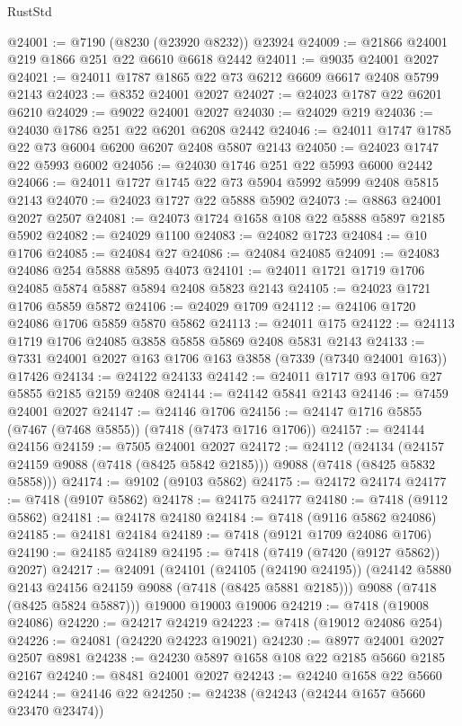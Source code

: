 \begin{lexlean}{RustStd}
\begin{coremodule}
@24001 := @7190 (@8230 (@23920 @8232)) @23924
@24009 := @21866 @24001 @219 @1866 @251 @22 @6610 @6618 @2442
@24011 := @9035 @24001 @2027
@24021 := @24011 @1787 @1865 @22 @73 @6212 @6609 @6617 @2408 @5799 @2143
@24023 := @8352 @24001 @2027
@24027 := @24023 @1787 @22 @6201 @6210
@24029 := @9022 @24001 @2027
@24030 := @24029 @219
@24036 := @24030 @1786 @251 @22 @6201 @6208 @2442
@24046 := @24011 @1747 @1785 @22 @73 @6004 @6200 @6207 @2408 @5807 @2143
@24050 := @24023 @1747 @22 @5993 @6002
@24056 := @24030 @1746 @251 @22 @5993 @6000 @2442
@24066 := @24011 @1727 @1745 @22 @73 @5904 @5992 @5999 @2408 @5815 @2143
@24070 := @24023 @1727 @22 @5888 @5902
@24073 := @8863 @24001 @2027 @2507
@24081 := @24073 @1724 @1658 @108 @22 @5888 @5897 @2185 @5902
@24082 := @24029 @1100
@24083 := @24082 @1723
@24084 := @10 @1706
@24085 := @24084 @27
@24086 := @24084 @24085
@24091 := @24083 @24086 @254 @5888 @5895 @4073
@24101 := @24011 @1721 @1719 @1706 @24085 @5874 @5887 @5894 @2408 @5823 @2143
@24105 := @24023 @1721 @1706 @5859 @5872
@24106 := @24029 @1709
@24112 := @24106 @1720 @24086 @1706 @5859 @5870 @5862
@24113 := @24011 @175
@24122 := @24113 @1719 @1706 @24085 @3858 @5858 @5869 @2408 @5831 @2143
@24133 := @7331 @24001 @2027 @163 @1706 @163 @3858 (@7339 (@7340 @24001 @163)) @17426
@24134 := @24122 @24133
@24142 := @24011 @1717 @93 @1706 @27 @5855 @2185 @2159 @2408
@24144 := @24142 @5841 @2143
@24146 := @7459 @24001 @2027
@24147 := @24146 @1706
@24156 := @24147 @1716 @5855 (@7467 (@7468 @5855)) (@7418 (@7473 @1716 @1706))
@24157 := @24144 @24156
@24159 := @7505 @24001 @2027
@24172 := @24112
    (@24134 (@24157 @24159 @9088 (@7418 (@8425 @5842 @2185))) @9088 (@7418 (@8425 @5832 @5858)))
@24174 := @9102 (@9103 @5862)
@24175 := @24172 @24174
@24177 := @7418 (@9107 @5862)
@24178 := @24175 @24177
@24180 := @7418 (@9112 @5862)
@24181 := @24178 @24180
@24184 := @7418 (@9116 @5862 @24086)
@24185 := @24181 @24184
@24189 := @7418 (@9121 @1709 @24086 @1706)
@24190 := @24185 @24189
@24195 := @7418 (@7419 (@7420 (@9127 @5862)) @2027)
@24217 := @24091
    (@24101
      (@24105 (@24190 @24195))
      (@24142 @5880 @2143 @24156 @24159 @9088 (@7418 (@8425 @5881 @2185)))
      @9088
      (@7418 (@8425 @5824 @5887)))
    @19000
    @19003
    @19006
@24219 := @7418 (@19008 @24086)
@24220 := @24217 @24219
@24223 := @7418 (@19012 @24086 @254)
@24226 := @24081 (@24220 @24223 @19021)
@24230 := @8977 @24001 @2027 @2507 @8981
@24238 := @24230 @5897 @1658 @108 @22 @2185 @5660 @2185 @2167
@24240 := @8481 @24001 @2027
@24243 := @24240 @1658 @22 @5660
@24244 := @24146 @22
@24250 := @24238 (@24243 (@24244 @1657 @5660 @23470 @23474))

\end{coremodule}
\end{lexlean}
